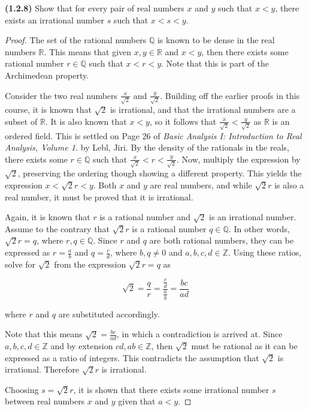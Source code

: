 \documentclass[12pt]{article}
\newcommand{\bR}{{\mathbb{R}}}
\newcommand{\bZ}{{\mathbb{Z}}}
\newcommand{\bQ}{{\mathbb{Q}}}
\begin{document}
\pagestyle{fancy}
\setlength{\headheight}{14.49998pt}
\fancyfoot[C]{\thepage}

\noindent \textbf{(1.2.8)} Show that for every pair of real numbers $x$ and $y$ such that $x < y$, there exists an irrational number $s$ such that $x < s < y$.

\begin{proof}
	The set of the rational numbers $\bQ$ is known to be dense in the real numbers $\bR$. This means that given $x,y\in\bR$ and $x<y$, then there exists some rational number $r\in\bQ$ such that $x<r<y$. Note that this is part of the Archimedean property. \newline
	
\indent Consider the two real numbers $\frac{x}{\sqrt{2}}$ and $\frac{y}{\sqrt{2}}$. Building off the earlier proofs in this course, it is known that $\sqrt{2}$ is irrational, and that the irrational numbers are a subset of $\bR$. It is also known that $x<y$, so it follows that $\frac{x}{\sqrt{2}} < \frac{y}{\sqrt{2}}$ as $\bR$ is an ordered field. This is settled on Page 26 of \textit{Basic Analysis I: Introduction to Real Analysis, Volume 1.} by Lebl, Jiri. By the density of the rationals in the reals, there exists some $r\in\bQ$ such that $\frac{x}{\sqrt{2}} < r < \frac{y}{\sqrt{2}}$. Now, multiply the expression by $\sqrt{2}$, preserving the ordering though showing a different property. This yields the expression $x < \sqrt{2}r < y$. Both $x$ and $y$ are real numbers, and while $\sqrt{2}r$ is also a real number, it must be proved that it is irrational.

\indent Again, it is known that $r$ is a rational number and $\sqrt{2}$ is an irrational number. Assume to the contrary that $\sqrt{2}r$ is a rational number $q\in\bQ$. In other words, $\sqrt{2}r = q$, where $r,q\in\bQ$. Since $r$ and $q$ are both rational numbers, they can be expressed as $r=\frac{a}{b}$ and $q=\frac{c}{d}$, where $b, q\neq0$ and $a,b,c,d\in\bZ$. Using these ratios, solve for $\sqrt{2}$ from the expression $\sqrt{2}r = q$ as

\begin{equation*}
	\sqrt{2}=\frac{q}{r}=\frac{\frac{c}{d}}{\frac{a}{b}}=\frac{bc}{ad}
\end{equation*}

\noindent where $r$ and $q$ are substituted accordingly.

\indent Note that this means $\sqrt{2}=\frac{bc}{ad}$, in which a contradiction is arrived at. Since $a,b,c,d\in\bZ$ and by extension $cd, ab\in\bZ$, then $\sqrt{2}$ must be rational as it can be expressed as a ratio of integers. This contradicts the assumption that $\sqrt{2}$ is irrational. Therefore $\sqrt{2}r$ is irrational.

\indent Choosing $s=\sqrt{2}r$, it is shown that there exists some irrational number $s$ between real numbers $x$ and $y$ given that $a<y$.
\end{proof} 
\end{document}
